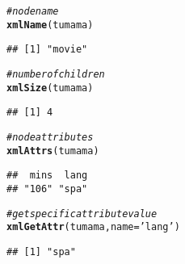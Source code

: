 \documentclass[12pt]{beamer}\usepackage[]{graphicx}\usepackage[]{color}
\makeatletter
\newcommand{\hlstr}[1]{\textcolor[rgb]{0.192,0.494,0.8}{#1}}%
\newcommand{\hlcom}[1]{\textcolor[rgb]{0.678,0.584,0.686}{\textit{#1}}}%
\newcommand{\hlstd}[1]{\textcolor[rgb]{0.345,0.345,0.345}{#1}}%
\newcommand{\hlkwc}[1]{\textcolor[rgb]{0.333,0.667,0.333}{#1}}%
\newcommand{\hlkwd}[1]{\textcolor[rgb]{0.737,0.353,0.396}{\textbf{#1}}}%
\newenvironment{kframe}{%
 \def\at@end@of@kframe{}%
 \ifinner\ifhmode%
  \def\at@end@of@kframe{\end{minipage}}%
  \begin{minipage}{\columnwidth}%
 \fi\fi%
 \def\FrameCommand##1{\hskip\@totalleftmargin \hskip-\fboxsep
 \colorbox{shadecolor}{##1}\hskip-\fboxsep
     \hskip-\linewidth \hskip-\@totalleftmargin \hskip\columnwidth}%
 \MakeFramed {\advance\hsize-\width
   \@totalleftmargin\z@ \linewidth\hsize
   \@setminipage}}%
 {\par\unskip\endMakeFramed%
 \at@end@of@kframe}
\newenvironment{knitrout}{}{} %
\makeatother
\begin{document}
\begin{frame}[fragile]
\begin{columns}[t]
\begin{column}{0.5\textwidth}
\begin{knitrout}\tiny
{}\color{fgcolor}\begin{kframe}
\begin{alltt}
\hlcom{# node name}
\hlkwd{xmlName}\hlstd{(tumama)}
\end{alltt}
\begin{verbatim}
## [1] "movie"
\end{verbatim}
\begin{alltt}
\hlcom{# number of children}
\hlkwd{xmlSize}\hlstd{(tumama)}
\end{alltt}
\begin{verbatim}
## [1] 4
\end{verbatim}
\begin{alltt}
\hlcom{# node attributes}
\hlkwd{xmlAttrs}\hlstd{(tumama)}
\end{alltt}
\begin{verbatim}
##  mins  lang 
## "106" "spa"
\end{verbatim}
\begin{alltt}
\hlcom{# get specific attribute value}
\hlkwd{xmlGetAttr}\hlstd{(tumama,} \hlkwc{name} \hlstd{=} \hlstr{'lang'}\hlstd{)}
\end{alltt}
\begin{verbatim}
## [1] "spa"
\end{verbatim}
\end{kframe}
\end{knitrout}
\end{column}
\end{columns}

\end{frame}

\end{document}
